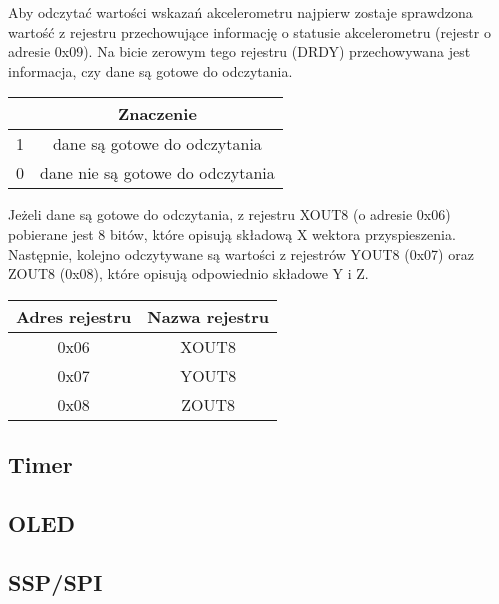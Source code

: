 \documentclass{classrep}
\begin{document}
		Aby odczytać wartości wskazań akcelerometru najpierw zostaje sprawdzona wartość z rejestru przechowujące informację o statusie akcelerometru (rejestr o adresie 0x09). Na bicie zerowym tego rejestru (DRDY) przechowywana jest informacja, czy dane są gotowe do odczytania.
\begin{center}
			\begin{tabular}{|c|c|}
			\hline 
			\vtop{\hbox{\strut \textbf{Wartość na bicie DRDY}}\hbox{\strut \textbf{rejestru 0x09}}} & \textbf{Znaczenie} \\ 
			\hline 
			1 & dane są gotowe do odczytania \\ 
			\hline 
			0 & dane nie są gotowe do odczytania \\ 
			\hline 
		\end{tabular} 
\end{center}
		
		Jeżeli dane są gotowe do odczytania, z rejestru XOUT8 (o adresie 0x06) pobierane jest 8 bitów, które opisują składową X wektora przyspieszenia. Następnie, kolejno odczytywane są wartości z rejestrów YOUT8 (0x07) oraz ZOUT8 (0x08), które opisują odpowiednio składowe Y i Z. 
		
\begin{center}
			\begin{tabular}{|c|c|}
			\hline 
			\textbf{Adres rejestru} & \textbf{Nazwa rejestru} \\ 
			\hline 
			0x06 & XOUT8 \\ 
			\hline 
			0x07 & YOUT8 \\ 
			\hline 
			0x08 &  ZOUT8\\ 
			\hline 
		\end{tabular} 
\end{center}
			
		\subsection{Timer}
		
		\subsection{OLED}
		
		\subsection{SSP/SPI}
		
\end{document}
